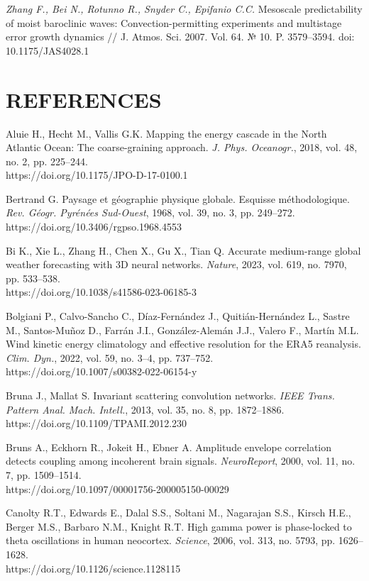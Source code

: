 \documentclass[12pt,a4paper]{article}
\begin{document}
\noindent \textit{Zhang F., Bei N., Rotunno R., Snyder C., Epifanio C.C.} Mesoscale predictability of moist baroclinic waves: Convection-permitting experiments and multistage error growth dynamics // J. Atmos. Sci. 2007. Vol. 64. № 10. P. 3579–3594. doi: 10.1175/JAS4028.1

\clearpage
\section{REFERENCES}

\noindent Aluie H., Hecht M., Vallis G.K. Mapping the energy cascade in the North Atlantic Ocean: The coarse-graining approach. \textit{J. Phys. Oceanogr.}, 2018, vol. 48, no. 2, pp. 225–244.\\ https://doi.org/10.1175/JPO-D-17-0100.1

\noindent Bertrand G. Paysage et géographie physique globale. Esquisse méthodologique. \textit{Rev. Géogr. Pyrénées Sud-Ouest}, 1968, vol. 39, no. 3, pp. 249–272.\\ https://doi.org/10.3406/rgpso.1968.4553

\noindent Bi K., Xie L., Zhang H., Chen X., Gu X., Tian Q. Accurate medium-range global weather forecasting with 3D neural networks. \textit{Nature}, 2023, vol. 619, no. 7970, pp. 533–538.\\ https://doi.org/10.1038/s41586-023-06185-3

\noindent Bolgiani P., Calvo-Sancho C., Díaz-Fernández J., Quitián-Hernández L., Sastre M., Santos-Muñoz D., Farrán J.I., González-Alemán J.J., Valero F., Martín M.L. Wind kinetic energy climatology and effective resolution for the ERA5 reanalysis. \textit{Clim. Dyn.}, 2022, vol. 59, no. 3–4, pp. 737–752.\\ https://doi.org/10.1007/s00382-022-06154-y

\noindent Bruna J., Mallat S. Invariant scattering convolution networks. \textit{IEEE Trans. Pattern Anal. Mach. Intell.}, 2013, vol. 35, no. 8, pp. 1872–1886.\\ https://doi.org/10.1109/TPAMI.2012.230

\noindent Bruns A., Eckhorn R., Jokeit H., Ebner A. Amplitude envelope correlation detects coupling among incoherent brain signals. \textit{NeuroReport}, 2000, vol. 11, no. 7, pp. 1509–1514.\\ https://doi.org/10.1097/00001756-200005150-00029

\noindent Canolty R.T., Edwards E., Dalal S.S., Soltani M., Nagarajan S.S., Kirsch H.E., Berger M.S., Barbaro N.M., Knight R.T. High gamma power is phase-locked to theta oscillations in human neocortex. \textit{Science}, 2006, vol. 313, no. 5793, pp. 1626–1628.\\ https://doi.org/10.1126/science.1128115
\end{document}
